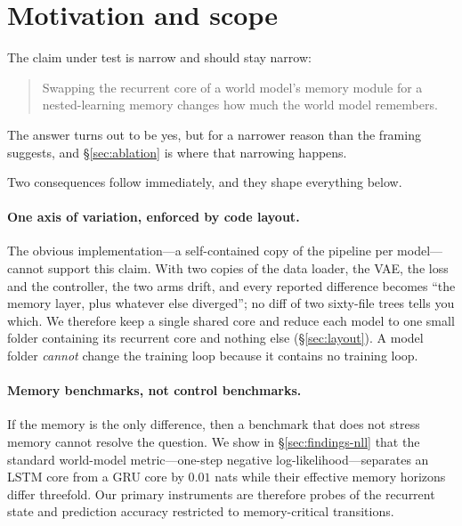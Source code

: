 \documentclass[11pt,a4paper]{article}
\begin{document}
\tableofcontents

\section{Motivation and scope}

The claim under test is narrow and should stay narrow:

\begin{quote}
Swapping the recurrent core of a world model's memory module for a
nested-learning memory changes how much the world model remembers.
\end{quote}

\noindent The answer turns out to be yes, but for a narrower reason than the
framing suggests, and \S\ref{sec:ablation} is where that narrowing happens.

Two consequences follow immediately, and they shape everything below.

\paragraph{One axis of variation, enforced by code layout.} The obvious
implementation---a self-contained copy of the pipeline per model---cannot
support this claim. With two copies of the data loader, the VAE, the loss and
the controller, the two arms drift, and every reported difference becomes ``the
memory layer, plus whatever else diverged''; no diff of two sixty-file trees
tells you which. We therefore keep a single shared core and reduce each model to
one small folder containing its recurrent core and nothing else
(\S\ref{sec:layout}). A model folder \emph{cannot} change the training loop
because it contains no training loop.

\paragraph{Memory benchmarks, not control benchmarks.} If the memory is the only
difference, then a benchmark that does not stress memory cannot resolve the
question. We show in \S\ref{sec:findings-nll} that the standard world-model
metric---one-step negative log-likelihood---separates an LSTM core from a GRU
core by $0.01$ nats while their effective memory horizons differ threefold. Our
primary instruments are therefore probes of the recurrent state and prediction
accuracy restricted to memory-critical transitions.
\end{document}
